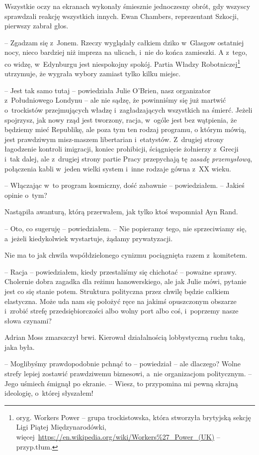 \documentclass[oneside,polish,11pt,sfheadings]{mwbk}
\begin{document}
Wszystkie oczy na ekranach wykonały śmiesznie jednoczesny obrót, gdy
wszyscy sprawdzali reakcję wszystkich innych. Ewan Chambers,
reprezentant Szkocji, pierwszy zabrał głos.

-- Zgadzam się z~Jonem. Rzeczy wyglądały całkiem dziko w~Glasgow
ostatniej nocy, nieco bardziej niż impreza na ulicach, i~nie do końca
zamieszki. A z~tego, co widzę, w~Edynburgu jest niespokojny spokój.
Partia Władzy Robotniczej\footnote{oryg. Workers Power -- grupa
trockistowska, która stworzyła brytyjską sekcję Ligi Piątej
Międzynarodówki, więcej~\url{https://en.wikipedia.org/wiki/Workers\%27_Power_(UK)} -- przyp.tłum.} utrzymuje, że wygrała wybory zamiast tylko kilku miejsc.

-- Jest tak samo tutaj -- powiedziała Julie O'Brien, nasz organizator z~Południowego Londynu -- ale nie sądzę, że powinniśmy się już martwić o~trockistów przejmujących władzę i~zagładzających wszystkich na śmierć.
Jeżeli spojrzysz, jak nowy rząd jest tworzony, racja, w~ogóle jest bez
wątpienia, że będziemy mieć Republikę, ale poza tym ten rodzaj programu,
o którym mówią, jest prawdziwym misz-maszem libertarian i~etatystów. Z~drugiej strony łagodzenie kontroli imigracji, koniec prohibicji,
ściągnięcie żołnierzy z~Grecji i~tak dalej, ale z~drugiej strony partie
Pracy przepychają tę \emph{zasadę przemysłową}, połączenia kabli w~jeden
wielki system i~inne rodzaje gówna z~XX wieku.

-- Włączając w~to program kosmiczny, dość zabawnie -- powiedziałem. -- Jakieś opinie o~tym?

Nastąpiła awanturą, którą przerwałem, jak tylko ktoś wspomniał Ayn Rand.

-- Oto, co sugeruję -- powiedziałem. -- Nie popieramy tego, nie
sprzeciwiamy się, a~jeżeli kiedykolwiek wystartuje, żądamy prywatyzacji.

Nie ma to jak chwila współdzielonego cynizmu pociągnięta razem z~komitetem. 

-- Racja -- powiedziałem, kiedy przestaliśmy się chichotać -- poważne sprawy. Cholernie dobra zagadka dla reżimu hanowerskiego, ale
jak Julie mówi, pytanie jest co się stanie potem. Struktura polityczna
przez chwilę będzie całkiem elastyczna. Może uda nam się położyć ręce na
jakimś opuszczonym obszarze i~zrobić strefę przedsiębiorczości albo
wolny port albo coś, i~poprzemy nasze słowa czynami?

Adrian Moss zmarszczył brwi. Kierował działalnością lobbystyczną ruchu
taką, jaka była. 

-- Moglibyśmy prawdopodobnie pchnąć to -- powiedział -- ale dlaczego? Wolne strefy lepiej zostawić prawdziwemu biznesowi, a~nie
organizacjom politycznym. -- Jego uśmiech śmignął po ekranie. -- Wiesz, to
przypomina mi pewną skrajną ideologię, o~której słyszałem!
\end{document}
